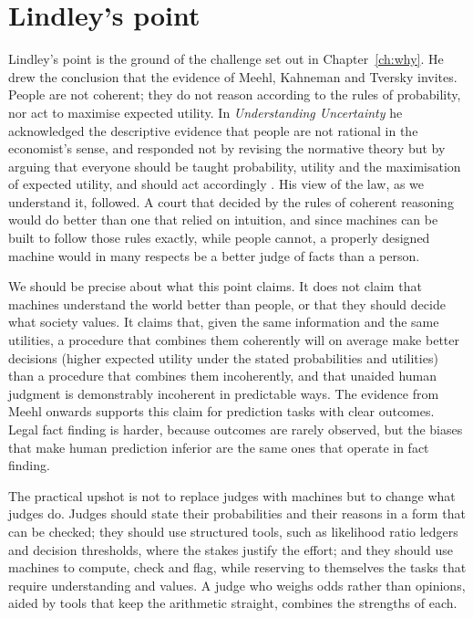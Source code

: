 \section{Lindley's point}

Lindley's point is the ground of the challenge set out in Chapter~\ref{ch:why}. He drew the conclusion that the evidence of Meehl, Kahneman and Tversky invites. People are not coherent; they do not reason according to the rules of probability, nor act to maximise expected utility. In \emph{Understanding Uncertainty} he acknowledged the descriptive evidence that people are not rational in the economist's sense, and responded not by revising the normative theory but by arguing that everyone should be taught probability, utility and the maximisation of expected utility, and should act accordingly \citep{lindley2006}. His view of the law, as we understand it, followed. A court that decided by the rules of coherent reasoning would do better than one that relied on intuition, and since machines can be built to follow those rules exactly, while people cannot, a properly designed machine would in many respects be a better judge of facts than a person.

We should be precise about what this point claims. It does not claim that machines understand the world better than people, or that they should decide what society values. It claims that, given the same information and the same utilities, a procedure that combines them coherently will on average make better decisions (higher expected utility under the stated probabilities and utilities) than a procedure that combines them incoherently, and that unaided human judgment is demonstrably incoherent in predictable ways. The evidence from Meehl onwards supports this claim for prediction tasks with clear outcomes. Legal fact finding is harder, because outcomes are rarely observed, but the biases that make human prediction inferior are the same ones that operate in fact finding.

The practical upshot is not to replace judges with machines but to change what judges do. Judges should state their probabilities and their reasons in a form that can be checked; they should use structured tools, such as likelihood ratio ledgers and decision thresholds, where the stakes justify the effort; and they should use machines to compute, check and flag, while reserving to themselves the tasks that require understanding and values. A judge who weighs odds rather than opinions, aided by tools that keep the arithmetic straight, combines the strengths of each.

